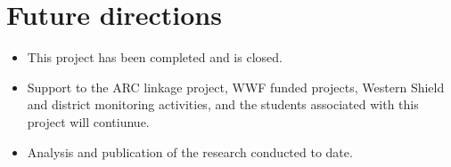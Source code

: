 \documentclass[version=last,
    paper=a4, %
    10pt, %
    usenames,
    dvipsnames,
    oneside, %
    headings=openany, %
    DIV=15 %
]{scrbook}
\begin{document}
\section*{Future directions}
\begin{itemize}
\itemsep1pt\parskip0pt
\item
  This project has been completed and is closed.
\item
  Support to the ARC linkage project, WWF funded projects, Western
  Shield and district monitoring activities, and the students associated
  with this project will contiunue.
\item
  Analysis and publication of the research conducted to date.
\end{itemize}



\end{document}

